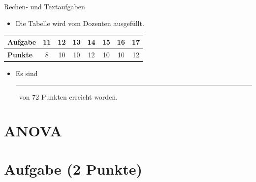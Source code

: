 \documentclass[a4paper, 9pt]{scrartcl}\usepackage[]{graphicx}\usepackage[]{xcolor}
\begin{document}
\begin{graybox}{Rechen- und Textaufgaben}
  \begin{itemize}
  \item Die Tabelle wird vom Dozenten ausgefüllt.
  \end{itemize}
  \begin{center}
    \large
    \begin{tabular}{|l|c|c|c|c|c|c|c|}
      \hline
      \textbf{Aufgabe} & 11 & 12 & 13 & 14 & 15 & 16 & 17 \strut\\
      \hline
      \textbf{Punkte} & 
      \hspace{1Ex}\Large\textcolor{gray!70}{8}\hspace{1Ex}  & 
      \hspace{1Ex}\Large\textcolor{gray!70}{10}\hspace{1Ex}  & 
      \hspace{1Ex}\Large\textcolor{gray!70}{10}\hspace{1Ex}  & 
      \hspace{1Ex}\Large\textcolor{gray!70}{12}\hspace{1Ex}  & 
      \hspace{1Ex}\Large\textcolor{gray!70}{10}\hspace{1Ex}  & 
      \hspace{1Ex}\Large\textcolor{gray!70}{10}\hspace{1Ex}  & 
      \hspace{1Ex}\Large\textcolor{gray!70}{12}\hspace{1Ex} \strut\\
      \hline
  \end{tabular}
\end{center}
\begin{itemize}
\item Es sind \rule[0ex]{2em}{.4pt}\, von 72 Punkten erreicht worden.
\end{itemize}
\end{graybox}

\clearpage

\section*{ANOVA}

\section{Aufgabe \hfill (2 Punkte)}
\end{document}
